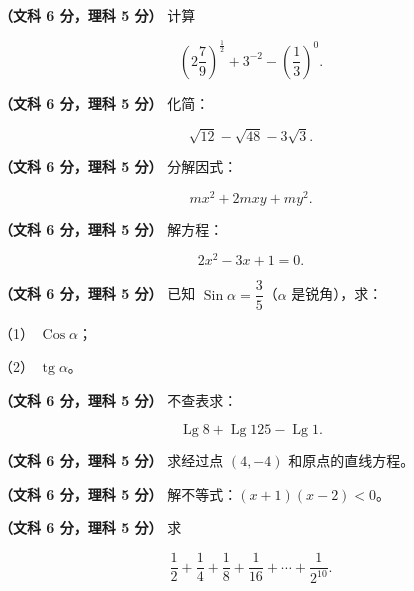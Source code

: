 \begin{question}
\textbf{（文科 6 分，理科 5 分）} 计算

\nopagebreak[4]
\[
\left(2\frac79\right)^{\frac12}+3^{-2}-\left(\frac13\right)^0.
\]

\end{question}
\begin{question}
\textbf{（文科 6 分，理科 5 分）} 化简：

\nopagebreak[4]
\[
\sqrt{12}-\sqrt{48}-3\sqrt3.
\]

\end{question}
\begin{question}
\textbf{（文科 6 分，理科 5 分）} 分解因式：

\nopagebreak[4]
\[
mx^2+2mxy+my^2.
\]

\end{question}
\begin{question}
\textbf{（文科 6 分，理科 5 分）} 解方程：

\nopagebreak[4]
\[
2x^2-3x+1=0.
\]

\end{question}
\begin{question}
\textbf{（文科 6 分，理科 5 分）} 已知 $\operatorname{Sin}\alpha=\dfrac35$（$\alpha$ 是锐角），求：

（1） $\operatorname{Cos}\alpha$；

（2） $\operatorname{tg}\alpha$。

\end{question}
\begin{question}
\textbf{（文科 6 分，理科 5 分）} 不查表求：

\nopagebreak[4]
\[
\operatorname{Lg}8+\operatorname{Lg}125-\operatorname{Lg}1.
\]

\end{question}
\begin{question}
\textbf{（文科 6 分，理科 5 分）} 求经过点 $(4,-4)$ 和原点的直线方程。

\end{question}
\begin{question}
\textbf{（文科 6 分，理科 5 分）} 解不等式：$(x+1)(x-2)<0$。

\end{question}
\begin{question}
\textbf{（文科 6 分，理科 5 分）} 求

\nopagebreak[4]
\[
\frac12+\frac14+\frac18+\frac1{16}+\cdots+\frac{1}{2^{10}}.
\]

\Needspace{0.4\textheight}
\end{question}
